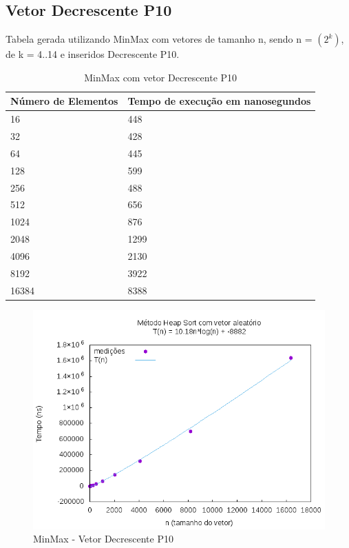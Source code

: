 \documentclass[12pt,a4paper,twoside]{report}
\begin{document}
\subsection{Vetor Decrescente P10}
Tabela gerada utilizando MinMax com vetores de tamanho n, sendo n = $(2^k)$, de k = 4..14 e inseridos Decrescente P10.
\begin{table}[H]
\centering
\caption{MinMax com vetor Decrescente P10}
\label{my-label}
\begin{tabular}{|l|l|}
\hline
\multicolumn{1}{|c|}{\textbf{Número de Elementos}} & \multicolumn{1}{c|}{\textbf{Tempo de execução em nanosegundos}} \\ \hline
16 & 448 \\ \hline
32 & 428 \\ \hline
64 & 445 \\ \hline
128 & 599 \\ \hline
256 & 488 \\ \hline
512 & 656 \\ \hline
1024 & 876 \\ \hline
2048 & 1299 \\ \hline
4096 & 2130 \\ \hline
8192 & 3922 \\ \hline
16384 & 8388 \\ \hline
\end{tabular}
\end{table}

\begin{figure}[H]
    \centering
    \includegraphics[width=0.7\linewidth]{graficos/HeapSort/vIntAleatorio/vIntAleatorio.png}
  \caption{MinMax - Vetor Decrescente P10}
\end{figure}
\end{document}
